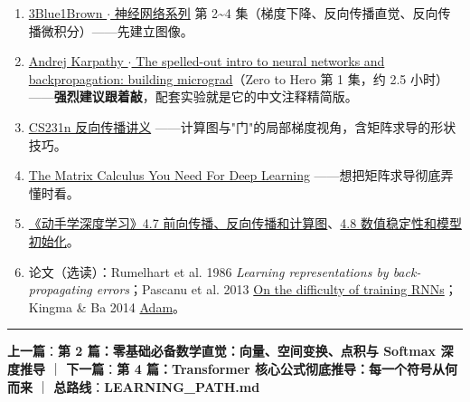 \begin{enumerate}
  \item {}\href{https://www.3blue1brown.com/topics/neural-networks}{3Blue1Brown $\cdot$ 神经网络系列} 第 2\textasciitilde{}4 集（梯度下降、反向传播直觉、反向传播微积分）——先建立图像。
  \item {}\href{https://karpathy.ai/zero-to-hero.html}{Andrej Karpathy $\cdot$ The spelled-out intro to neural networks and backpropagation: building micrograd}（Zero to Hero 第 1 集，约 2.5 小时）——\textbf{强烈建议跟着敲}，配套实验就是它的中文注释精简版。
  \item {}\href{https://cs231n.github.io/optimization-2/}{CS231n 反向传播讲义} ——计算图与"门"的局部梯度视角，含矩阵求导的形状技巧。
  \item {}\href{https://explained.ai/matrix-calculus/}{The Matrix Calculus You Need For Deep Learning} ——想把矩阵求导彻底弄懂时看。
  \item {}\href{https://zh.d2l.ai/chapter\_multilayer-perceptrons/backprop.html}{《动手学深度学习》4.7 前向传播、反向传播和计算图}、\href{https://zh.d2l.ai/chapter\_multilayer-perceptrons/numerical-stability-and-init.html}{4.8 数值稳定性和模型初始化}。
  \item 论文（选读）：Rumelhart et al. 1986 \textit{Learning representations by back-propagating errors}；Pascanu et al. 2013 \href{https://arxiv.org/abs/1211.5063}{On the difficulty of training RNNs}；Kingma \& Ba 2014 \href{https://arxiv.org/abs/1412.6980}{Adam}。
\end{enumerate}

\vspace{0.8em}\hrule\vspace{0.8em}

\textbf{上一篇}：\textbf{第 2 篇：零基础必备数学直觉：向量、空间变换、点积与 Softmax 深度推导} ｜ \textbf{下一篇}：\textbf{第 4 篇：Transformer 核心公式彻底推导：每一个符号从何而来} ｜ \textbf{总路线}：\textbf{LEARNING\_PATH.md}
